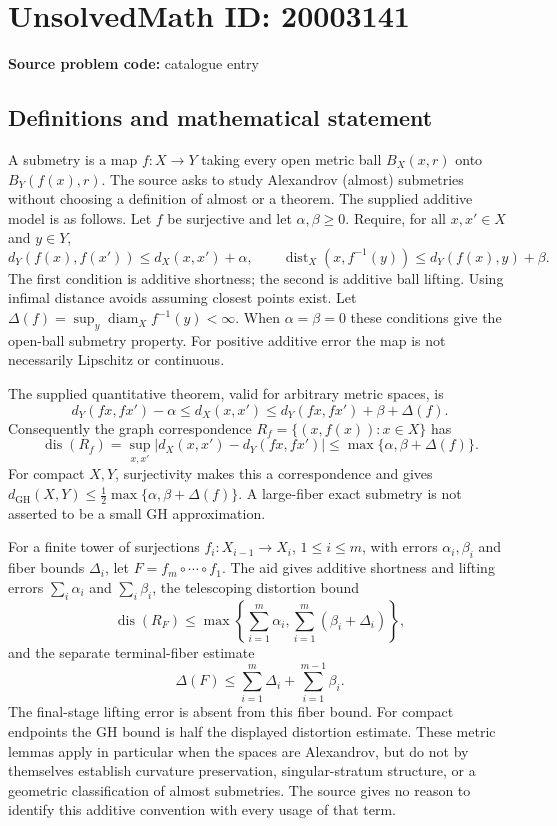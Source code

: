 \documentclass[11pt]{article}
\begin{document}
\section*{UnsolvedMath ID: 20003141}
\textbf{Source problem code:} catalogue entry
\subsection{Definitions and mathematical statement}
A submetry is a map $f:X\to Y$ taking every open metric ball $B_X(x,r)$ onto $B_Y(f(x),r)$. The source asks to study Alexandrov (almost) submetries without choosing a definition of almost or a theorem. The supplied additive model is as follows. Let $f$ be surjective and let $\alpha,\beta\geq0$. Require, for all $x,x'\in X$ and $y\in Y$,
\[
d_Y(f(x),f(x'))\leq d_X(x,x')+\alpha,\qquad
\operatorname{dist}_X(x,f^{-1}(y))\leq d_Y(f(x),y)+\beta.
\]
The first condition is additive shortness; the second is additive ball lifting. Using infimal distance avoids assuming closest points exist. Let $\Delta(f)=\sup_y\operatorname{diam}_X f^{-1}(y)<\infty$. When $\alpha=\beta=0$ these conditions give the open-ball submetry property. For positive additive error the map is not necessarily Lipschitz or continuous.

The supplied quantitative theorem, valid for arbitrary metric spaces, is
\[
d_Y(fx,fx')-\alpha\leq d_X(x,x')\leq
 d_Y(fx,fx')+\beta+\Delta(f).
\]
Consequently the graph correspondence $R_f=\{(x,f(x)):x\in X\}$ has
\[
\operatorname{dis}(R_f)=\sup_{x,x'}|d_X(x,x')-d_Y(fx,fx')|
\leq\max\{\alpha,\beta+\Delta(f)\}.
\]
For compact $X,Y$, surjectivity makes this a correspondence and gives $d_{\mathrm{GH}}(X,Y)\leq\tfrac12\max\{\alpha,\beta+\Delta(f)\}$. A large-fiber exact submetry is not asserted to be a small GH approximation.

For a finite tower of surjections $f_i:X_{i-1}\to X_i$, $1\leq i\leq m$, with errors $\alpha_i,\beta_i$ and fiber bounds $\Delta_i$, let $F=f_m\circ\cdots\circ f_1$. The aid gives additive shortness and lifting errors $\sum_i\alpha_i$ and $\sum_i\beta_i$, the telescoping distortion bound
\[
\operatorname{dis}(R_F)\leq
\max\left\{\sum_{i=1}^m\alpha_i,\sum_{i=1}^m(\beta_i+\Delta_i)\right\},
\]
and the separate terminal-fiber estimate
\[
\Delta(F)\leq\sum_{i=1}^m\Delta_i+\sum_{i=1}^{m-1}\beta_i.
\]
The final-stage lifting error is absent from this fiber bound. For compact endpoints the GH bound is half the displayed distortion estimate. These metric lemmas apply in particular when the spaces are Alexandrov, but do not by themselves establish curvature preservation, singular-stratum structure, or a geometric classification of almost submetries. The source gives no reason to identify this additive convention with every usage of that term.
\end{document}
